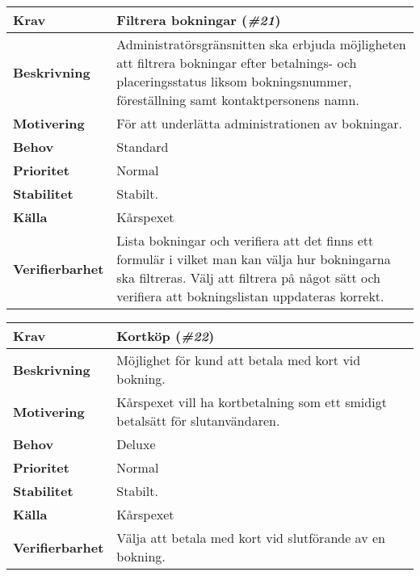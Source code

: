 \documentclass[a4paper, twoside, 11pt, titlepage]{article}
\begin{document}
	\begin{tabular} { p{2.6cm} p{12.5cm} }
		\hline
		\sffamily\textbf{Krav} & Filtrera bokningar (\emph{\#21})  \\
		\hline
		\sffamily\textbf{Beskrivning} & Administratörsgränsnitten ska erbjuda möjligheten att filtrera bokningar efter betalnings- och placeringsstatus liksom bokningsnummer, föreställning samt kontaktpersonens namn.  \\
		\hline
		\sffamily\textbf{Motivering} & För att underlätta administrationen av bokningar.  \\
		\hline
		\sffamily\textbf{Behov} & Standard  \\
		\hline
		\sffamily\textbf{Prioritet} & Normal  \\
		\hline
		\sffamily\textbf{Stabilitet} & Stabilt.  \\
		\hline
		\sffamily\textbf{Källa} & Kårspexet  \\
		\hline
		\sffamily\textbf{Verifierbarhet} & Lista bokningar och verifiera att det finns ett formulär i vilket man kan välja hur bokningarna ska filtreras. Välj att filtrera på något sätt och verifiera att bokningslistan uppdateras korrekt.  \\
		\hline
	\end{tabular}
	\vspace{6mm}

	\begin{tabular} { p{2.6cm} p{12.5cm} }
		\hline
		\sffamily\textbf{Krav} & Kortköp (\emph{\#22})  \\
		\hline
		\sffamily\textbf{Beskrivning} & Möjlighet för kund att betala med kort vid bokning.  \\
		\hline
		\sffamily\textbf{Motivering} & Kårspexet vill ha kortbetalning som ett smidigt betalsätt för slutanvändaren.  \\
		\hline
		\sffamily\textbf{Behov} & Deluxe  \\
		\hline
		\sffamily\textbf{Prioritet} & Normal  \\
		\hline
		\sffamily\textbf{Stabilitet} & Stabilt.  \\
		\hline
		\sffamily\textbf{Källa} & Kårspexet  \\
		\hline
		\sffamily\textbf{Verifierbarhet} & Välja att betala med kort vid slutförande av en bokning.  \\
		\hline
	\end{tabular}
	\vspace{6mm}
\end{document}
